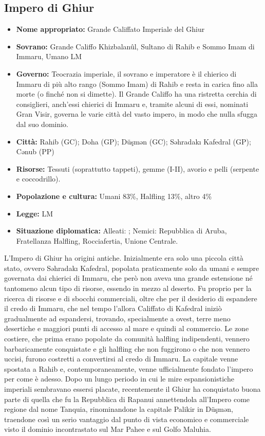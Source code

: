 \documentclass[a4paper]{report}
\begin{document}
\begin{multicols}{2}
\subsection*{Impero di Ghiur}
\begin{itemize}
	\item \textbf{Nome appropriato:} Grande Califfato Imperiale del Ghiur
	\item \textbf{Sovrano:} Grande Califfo Khizbalanûl, Sultano di Rahib e Sommo Imam di Immaru, Umano LM
	\item \textbf{Governo:} Teocrazia imperiale, il sovrano e imperatore è il chierico di Immaru di più alto rango (Sommo Imam) di Rahib e resta in carica fino alla morte (o finché non si dimette). Il Grande Califfo ha una ristretta cerchia di consiglieri, anch’essi chierici di Immaru e, tramite alcuni di essi, nominati Gran Visir, governa le varie città del vasto impero, in modo che nulla sfugga dal suo dominio.
	\item \textbf{Città:} Rahib (GC); Doha (GP); Düşmən (GC); Səhradakı Kafedral (GP); Cənub (PP)
	\item \textbf{Risorse:} Tessuti (soprattutto tappeti), gemme (I-II), avorio e pelli (serpente e coccodrillo).
	\item \textbf{Popolazione e cultura:} Umani 83\%, Halfling 13\%, altro 4\%
	\item \textbf{Legge:} LM
	\item \textbf{Situazione diplomatica:} Alleati: ; Nemici: Repubblica di Aruba, Fratellanza Halfling, Rocciafertia, Unione Centrale.
\end{itemize}
L’Impero di Ghiur ha origini antiche. Inizialmente era solo una piccola città stato, ovvero Səhradakı Kafedral, popolata praticamente solo da umani e sempre governata dai chierici di Immaru, che però non aveva una grande estensione né tantomeno alcun tipo di risorse, essendo in mezzo al deserto. Fu proprio per la ricerca di risorse e di sbocchi commerciali, oltre che per il desiderio di espandere il credo di Immaru, che nel tempo l’allora Califfato di Kafedral iniziò gradualmente ad espandersi, trovando, specialmente a ovest, terre meno desertiche e maggiori punti di accesso al mare e quindi al commercio. Le zone costiere, che prima erano popolate da comunità halfling indipendenti, vennero barbaricamente conquistate e gli halfling che non fuggirono o che non vennero uccisi, furono costretti a convertirsi al credo di Immaru. La capitale venne spostata a Rahib e, contemporaneamente, venne ufficialmente fondato l’impero per come è adesso. Dopo un lungo periodo in cui le mire espansionistiche imperiali sembravano essersi placate, recentemente il Ghiur ha conquistato buona parte di quella che fu la Repubblica di Rapanui annettendola all’Impero come regione dal nome Tanquia, rinominandone la capitale Palikir in Düşmən, traendone così un serio vantaggio dal punto di vista economico e commerciale visto il dominio incontrastato sul Mar Pahee e sul Golfo Maluhia.


\end{multicols}
\end{document}
